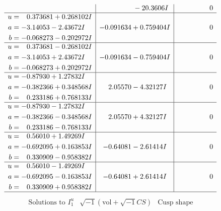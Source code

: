 \documentclass[1p]{elsarticle_modified}
\theoremstyle{definition}
\newcommand{\I}{\sqrt{-1}}
\begin{document}
$$\begin{array}{c|c|c}
 & \phantom{-0.000000 } -20.3606 I & \phantom{-0.000000 } 0 \\ \hline\begin{aligned}
u &= \phantom{-}0.373681 + 0.268102 I \\
a &= -3.14053 - 2.43672 I \\
b &= -0.068273 - 0.202972 I\end{aligned}
 & -0.091634 + 0.759404 I & \phantom{-0.000000 } 0 \\ \hline\begin{aligned}
u &= \phantom{-}0.373681 - 0.268102 I \\
a &= -3.14053 + 2.43672 I \\
b &= -0.068273 + 0.202972 I\end{aligned}
 & -0.091634 - 0.759404 I & \phantom{-0.000000 } 0 \\ \hline\begin{aligned}
u &= -0.87930 + 1.27832 I \\
a &= -0.382366 + 0.348568 I \\
b &= \phantom{-}0.233186 + 0.768133 I\end{aligned}
 & \phantom{-}2.05570 - 4.32127 I & \phantom{-0.000000 } 0 \\ \hline\begin{aligned}
u &= -0.87930 - 1.27832 I \\
a &= -0.382366 - 0.348568 I \\
b &= \phantom{-}0.233186 - 0.768133 I\end{aligned}
 & \phantom{-}2.05570 + 4.32127 I & \phantom{-0.000000 } 0 \\ \hline\begin{aligned}
u &= \phantom{-}0.56010 + 1.49269 I \\
a &= -0.692095 + 0.163853 I \\
b &= \phantom{-}0.330909 - 0.958382 I\end{aligned}
 & -0.64081 - 2.61414 I & \phantom{-0.000000 } 0 \\ \hline\begin{aligned}
u &= \phantom{-}0.56010 - 1.49269 I \\
a &= -0.692095 - 0.163853 I \\
b &= \phantom{-}0.330909 + 0.958382 I\end{aligned}
 & -0.64081 + 2.61414 I & \phantom{-0.000000 } 0\\
 \hline 
 \end{array}$$\newpage$$\begin{array}{c|c|c}  
\text{Solutions to }I^u_{1}& \I (\text{vol} + \sqrt{-1}CS) & \text{Cusp shape}\\

\end{array}$$
\end{document}
